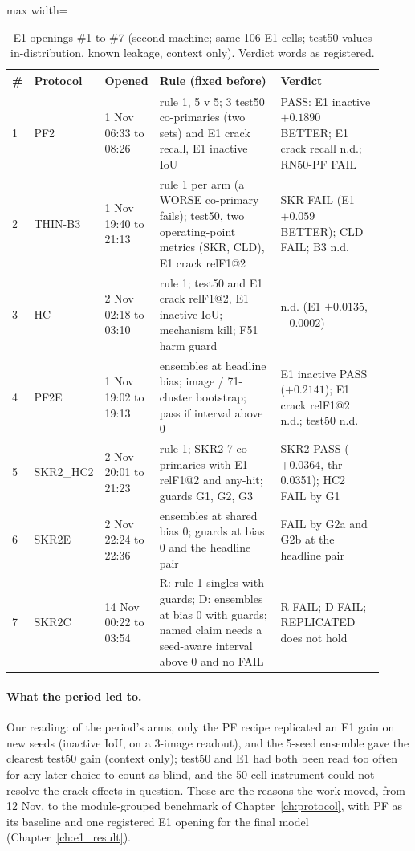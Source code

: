 \begin{table}[htbp]
\centering
\scriptsize
\caption[E1 openings \#1 to \#7 with rule and verdict]{E1 openings \#1 to \#7 (second machine; same 106 E1 cells; test50 values
in-distribution, known leakage, context only). Verdict words as registered.}
\label{tab:midnov-ledger}
\begin{adjustbox}{max width=\linewidth}
\begin{tabular}{@{}p{0.03\linewidth}p{0.14\linewidth}p{0.13\linewidth}p{0.33\linewidth}p{0.29\linewidth}@{}}
\toprule
\# & Protocol & Opened & Rule (fixed before) & Verdict \\
\midrule
1 & PF2 & 1 Nov 06:33 to 08:26 & rule 1, 5 v 5; 3 test50 co-primaries (two sets) and E1 crack recall, E1 inactive IoU & PASS: E1 inactive $+0.1890$ BETTER; E1 crack recall n.d.; RN50-PF FAIL \\
2 & THIN-B3 & 1 Nov 19:40 to 21:13 & rule 1 per arm (a WORSE co-primary fails); test50, two operating-point metrics (SKR, CLD), E1 crack relF1@2 & SKR FAIL (E1 $+0.059$ BETTER); CLD FAIL; B3 n.d. \\
3 & HC & 2 Nov 02:18 to 03:10 & rule 1; test50 and E1 crack relF1@2, E1 inactive IoU; mechanism kill; F51 harm guard & n.d. (E1 $+0.0135$, $-0.0002$) \\
4 & PF2E & 1 Nov 19:02 to 19:13 & ensembles at headline bias; image / 71-cluster bootstrap; pass if interval above 0 & E1 inactive PASS ($+0.2141$); E1 crack relF1@2 n.d.; test50 n.d. \\
5 & SKR2\_HC2 & 2 Nov 20:01 to 21:23 & rule 1; SKR2 7 co-primaries with E1 relF1@2 and any-hit; guards G1, G2, G3 & SKR2 PASS ($+0.0364$, thr 0.0351); HC2 FAIL by G1 \\
6 & SKR2E & 2 Nov 22:24 to 22:36 & ensembles at shared bias 0; guards at bias 0 and the headline pair & FAIL by G2a and G2b at the headline pair \\
7 & SKR2C & 14 Nov 00:22 to 03:54 & R: rule 1 singles with guards; D: ensembles at bias 0 with guards; named claim needs a seed-aware interval above 0 and no FAIL & R FAIL; D FAIL; REPLICATED does not hold \\
\bottomrule
\end{tabular}
\end{adjustbox}
\end{table}

\paragraph{What the period led to.} Our reading: of the period's arms, only the PF recipe replicated an E1 gain on new seeds
(inactive IoU, on a 3-image readout), and the 5-seed ensemble gave the clearest test50 gain (context only); test50 and E1 had both been read too
often for any later choice to count as blind, and the 50-cell instrument could not resolve the crack effects in question. These are
the reasons the work moved, from 12 Nov, to the module-grouped benchmark of Chapter~\ref{ch:protocol}, with PF as its baseline and
one registered E1 opening for the final model (Chapter~\ref{ch:e1_result}).

